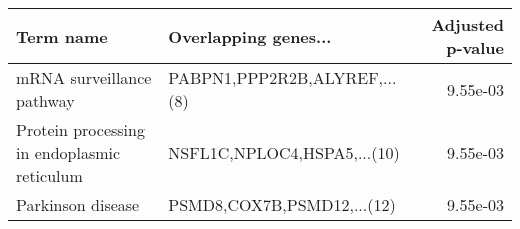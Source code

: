 \begin{tabular}{llr}
\toprule
                                  Term name &         Overlapping genes... &  Adjusted p-value \\
\midrule
                  mRNA surveillance pathway & PABPN1,PPP2R2B,ALYREF,...(8) &          9.55e-03 \\
Protein processing in endoplasmic reticulum &  NSFL1C,NPLOC4,HSPA5,...(10) &          9.55e-03 \\
                          Parkinson disease &   PSMD8,COX7B,PSMD12,...(12) &          9.55e-03 \\
\bottomrule
\end{tabular}

